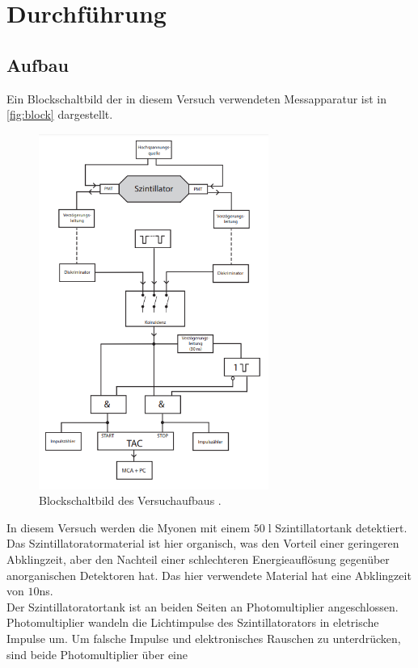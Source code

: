 \section{Durchführung}
\subsection{Aufbau}
Ein Blockschaltbild der in diesem Versuch verwendeten Messapparatur ist in \autoref{fig:block}
dargestellt.
\begin{figure}
    \centering
    \includegraphics[width=0.67\textwidth]{block.png}
    \caption{Blockschaltbild des Versuchaufbaus \cite{anleitung}.}
    \label{fig:block}
\end{figure}
In diesem Versuch werden die Myonen mit einem $50 \;$l Szintillatortank detektiert. Das Szintillatoratormaterial 
ist hier organisch, was den Vorteil einer geringeren Abklingzeit, aber den Nachteil einer schlechteren Energieauflösung 
gegenüber anorganischen Detektoren hat. Das hier verwendete Material hat eine Abklingzeit von $10$\;ns.\\
Der Szintillatoratortank ist an beiden Seiten an Photomultiplier angeschlossen. Photomultiplier wandeln die Lichtimpulse 
des Szintillatorators in eletrische Impulse um.
Um falsche Impulse und elektronisches Rauschen zu unterdrücken, sind beide Photomultiplier über eine 

